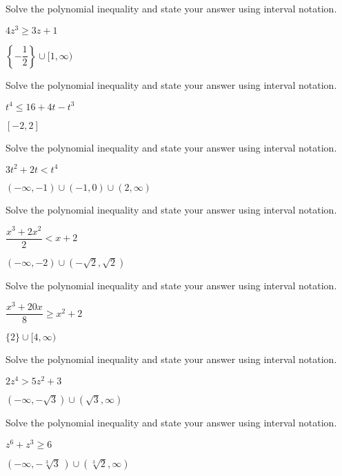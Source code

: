 \documentclass{ximera}
\begin{document}
\begin{problem}
Solve the polynomial inequality and state your answer using interval notation.

$4z^3 \geq 3z+1$

\begin{solution}
$\left\{ -\dfrac{1}{2} \right\} \cup [1, \infty)$
\end{solution} 
\end{problem}

\begin{problem}
Solve the polynomial inequality and state your answer using interval notation.

$t^4 \leq 16+4t-t^3$

$[-2,2]$
\end{problem}

\begin{problem}
Solve the polynomial inequality and state your answer using interval notation.

$3t^2 + 2t < t^4$

$\left(-\infty, -1 \right) \cup \left(-1, 0 \right) \cup (2, \infty)$

\end{problem}

\begin{problem}
Solve the polynomial inequality and state your answer using interval notation.

$\dfrac{x^3+2 x^2}{2} < x+2$

\begin{solution}
$(-\infty, -2) \cup \left(-\sqrt{2}, \sqrt{2} \right)$
\end{solution}
\end{problem}

\begin{problem}
Solve the polynomial inequality and state your answer using interval notation.

$\dfrac{x^3+20x}{8} \geq x^2 + 2$

$\{2 \} \cup [4,\infty)$
\end{problem}

\begin{problem}
Solve the polynomial inequality and state your answer using interval notation.

$2z^4>5z^2+3$

$(-\infty, -\sqrt{3}) \cup (\sqrt{3}, \infty)$
\end{problem}

\begin{problem}\label{polyinequexerlast}
Solve the polynomial inequality and state your answer using interval notation.

$z^6 + z^3 \geq 6$

\begin{solution}
$(-\infty, -\sqrt[3]{3}\,) \cup (\sqrt[3]{2}, \infty)$
\end{solution}
\end{problem} 
\end{document}
